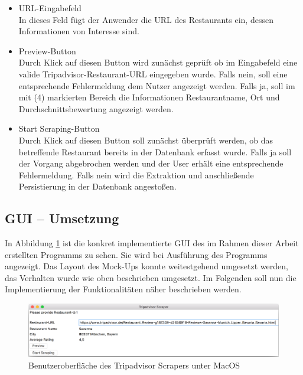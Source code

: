 \documentclass[a4paper,oneside,12pt]{report}
\begin{document}
            \begin{itemize}
            \item[(1)] URL-Eingabefeld	\\
            In dieses Feld fügt der Anwender die URL des Restaurants ein, dessen Informationen von Interesse sind.
            \item[(2)] Preview-Button\\
            Durch Klick auf diesen Button wird zunächst geprüft ob im Eingabefeld eine valide Tripadvisor-Restaurant-URL eingegeben wurde. Falls nein, soll eine entsprechende Fehlermeldung dem Nutzer angezeigt werden. Falls ja, soll im mit (4) markierten Bereich die Informationen Restaurantname, Ort und Durchschnittsbewertung angezeigt werden.
            \item[(3)]	Start Scraping-Button\\
            Durch Klick auf diesen Button soll zunächst überprüft werden, ob das betreffende Restaurant bereits in der Datenbank erfasst wurde. Falls ja soll der Vorgang abgebrochen werden und der User erhält eine entsprechende Fehlermeldung. Falls nein wird die Extraktion und anschließende Persistierung in der Datenbank angestoßen. 
            \end{itemize}
			
			\subsection[GUI - Umsetzung - Skanny Morandi]{GUI – Umsetzung}
			In Abbildung \ref{pic-GUI} ist die konkret implementierte GUI des im Rahmen dieser Arbeit erstellten Programms zu sehen. Sie wird bei Ausführung des Programms angezeigt. Das Layout des Mock-Ups konnte weitestgehend umgesetzt werden, das Verhalten wurde wie oben beschrieben umgesetzt. Im Folgenden soll nun die Implementierung der Funktionalitäten näher beschrieben werden.

				\begin{figure}[H]
					\centering
					\begin{minipage}[b]{0.9\textwidth}
						\includegraphics[width=\textwidth]{Bilder/GUI.png}
					\end{minipage}
					\centering
					\caption[Benutzeroberfläche des Tripadvisor Scrapers unter MacOS]{Benutzeroberfläche des Tripadvisor Scrapers unter MacOS}
					\label{pic-GUI}
				\end{figure}
\end{document}
